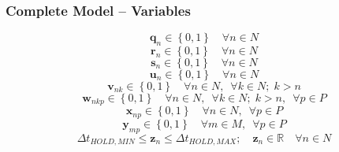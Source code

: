 \documentclass{beamer}
\begin{document}
\begin{frame}
    \frametitle{Complete Model -- Variables}
    \begin{equation}
        \boldsymbol{q}_{n} \in \left\{0, 1\right\} \quad \forall n \in N
    \end{equation}
    \begin{equation}
        \boldsymbol{r}_{n} \in \left\{ 0, 1 \right\} \quad \forall n \in N
    \end{equation}
    \begin{equation}
        \boldsymbol{s}_{n} \in \left\{ 0, 1 \right\} \quad \forall n \in N
    \end{equation} 
    \begin{equation}
        \boldsymbol{u}_{n} \in \left\{ 0, 1 \right\} \quad \forall n \in N
    \end{equation}
    \begin{equation}
        \boldsymbol{v}_{nk} \in \left\{ 0, 1 \right\} \quad \forall n \in N,
        \enspace \forall k \in N; \; k > n
    \end{equation}
    \begin{equation}
        \boldsymbol{w}_{nkp} \in \left\{ 0, 1 \right\} \quad \forall n \in N, 
        \enspace \forall k \in N; \; k > n, \enspace \forall p \in P
    \end{equation}
    \begin{equation}
        \boldsymbol{x}_{np} \in \left\{ 0, 1 \right\} \quad \forall n \in N,
        \enspace \forall p \in P
    \end{equation}
    \begin{equation}
        \boldsymbol{y}_{mp} \in \left\{ 0, 1 \right\} \quad \forall m \in M,
        \enspace \forall p \in P
    \end{equation}
    \begin{equation}
        \Delta t_{\mathit{HOLD,MIN}} \le \boldsymbol{z}_{n} \le 
        \Delta t_{\mathit{HOLD,MAX}}; \quad
        \boldsymbol{z}_{n} \in \mathbb{R} \quad \forall n \in N
    \end{equation}
\end{frame}
\end{document}
